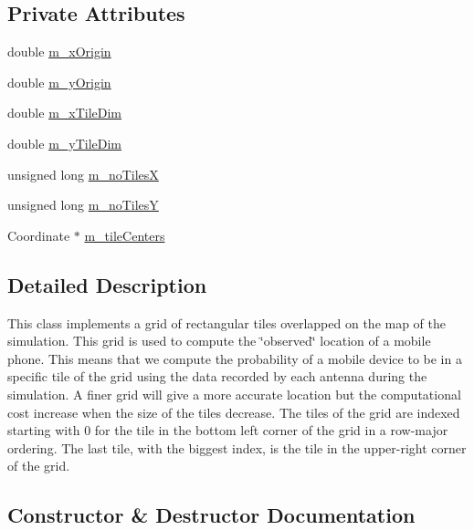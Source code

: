 \subsection*{Private Attributes}
\begin{DoxyCompactItemize}
\item 
double \mbox{\hyperlink{class_grid_ae109d428ac5489815748e92fdde1b91f}{m\+\_\+x\+Origin}}
\item 
double \mbox{\hyperlink{class_grid_a16b2fc5a6e96ad2d59d59b52db83f4aa}{m\+\_\+y\+Origin}}
\item 
double \mbox{\hyperlink{class_grid_a48c3d1fc34a14bff8b9176558a8b6f4e}{m\+\_\+x\+Tile\+Dim}}
\item 
double \mbox{\hyperlink{class_grid_a497eeffc4a16a021e15ecbc130f4f644}{m\+\_\+y\+Tile\+Dim}}
\item 
unsigned long \mbox{\hyperlink{class_grid_a177bfdc70436c25a1510d1abe19e34c1}{m\+\_\+no\+TilesX}}
\item 
unsigned long \mbox{\hyperlink{class_grid_a8fe14c4781dfd5623922fcc1f9c10130}{m\+\_\+no\+TilesY}}
\item 
Coordinate $\ast$ \mbox{\hyperlink{class_grid_a27b99b13ac7e5bec81f7b8704bc3405a}{m\+\_\+tile\+Centers}}
\end{DoxyCompactItemize}


\subsection{Detailed Description}
This class implements a grid of rectangular tiles overlapped on the map of the simulation. This grid is used to compute the \char`\"{}observed\char`\"{} location of a mobile phone. This means that we compute the probability of a mobile device to be in a specific tile of the grid using the data recorded by each antenna during the simulation. A finer grid will give a more accurate location but the computational cost increase when the size of the tiles decrease. The tiles of the grid are indexed starting with 0 for the tile in the bottom left corner of the grid in a row-\/major ordering. The last tile, with the biggest index, is the tile in the upper-\/right corner of the grid. 

\subsection{Constructor \& Destructor Documentation}
\mbox{\label{class_grid_a84b0dc169028f21175a4549afde86153}} 
